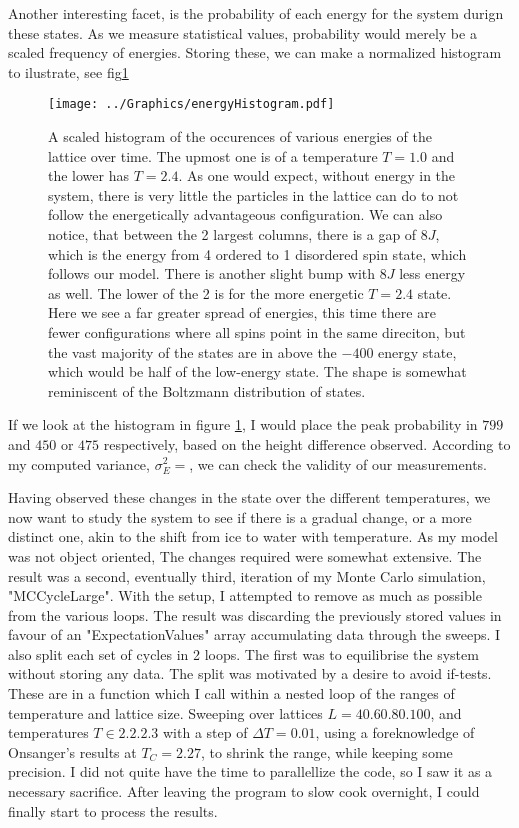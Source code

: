 \documentclass[10pt, twocolumn]{revtex4-1}
\begin{document}
Another interesting facet, is the probability of each energy for the system durign these states. As we measure statistical values, probability would merely
be a scaled frequency of energies. Storing these, we can make a normalized histogram to ilustrate, see fig\ref{fig:PrEhist}
\begin{figure}[hbtp]
    \texttt{[image: ../Graphics/energyHistogram.pdf]}
    \caption{A scaled histogram of the occurences of various energies of the lattice over time. The upmost one is of a temperature $T=1.0$ and the lower
    has $T=2.4$. As one would expect, without energy in the system, there is very little the particles in the lattice can do to not follow the energetically
    advantageous configuration. We can also notice, that between the 2 largest columns, there is a gap of $8J$, which is the energy from 4 ordered to 1
    disordered spin state, which follows our model. There is another slight bump with $8J$ less energy as well. The lower of the 2 is for the more energetic
    $T=2.4$ state. Here we see a far greater spread of energies, this time there are fewer configurations where all spins point in the same direciton, but the
    vast majority of the states are in above the $-400$ energy state, which would be half of the low-energy state. The shape is somewhat reminiscent of the
    Boltzmann distribution of states.}
\label{fig:PrEhist}
\end{figure}
If we look at the histogram in figure \ref{fig:PrEhist}, I would place the peak probability in $799$ and $450$ or $475$ respectively, based on the height
difference observed. According to my computed variance, $\sigma_E^2=$, we can check the validity of our measurements.


Having observed these changes in the state over the different temperatures, we now want to study the system to see if there is a gradual change, or a more
distinct one, akin to the shift from ice to water with temperature. As my model was not object oriented, The changes required were somewhat extensive. The
result was a second, eventually third, iteration of my Monte Carlo simulation, "MCCycleLarge". With the setup, I attempted to remove as much as possible from
the various loops. The result was discarding the previously stored values in favour of an "ExpectationValues" array accumulating data through the sweeps. I
also split each set of cycles in 2 loops. The first was to equilibrise the system without storing any data. The split was motivated by a desire to avoid
if-tests. These are in a function which I call within a nested loop of the ranges of temperature and lattice size. Sweeping over lattices
$L = \qty{40, 60, 80, 100}$, and temperatures $T \in \qty{2.2, 2.3}$ with a step of $\Delta T = 0.01$, using a foreknowledge of Onsanger's results at
$T_C = 2.27$, to shrink the range, while keeping some precision. I did not quite have the time to parallellize the code, so I saw it as a necessary
sacrifice. After leaving the program to slow cook overnight, I could finally start to process the results.
\end{document}
